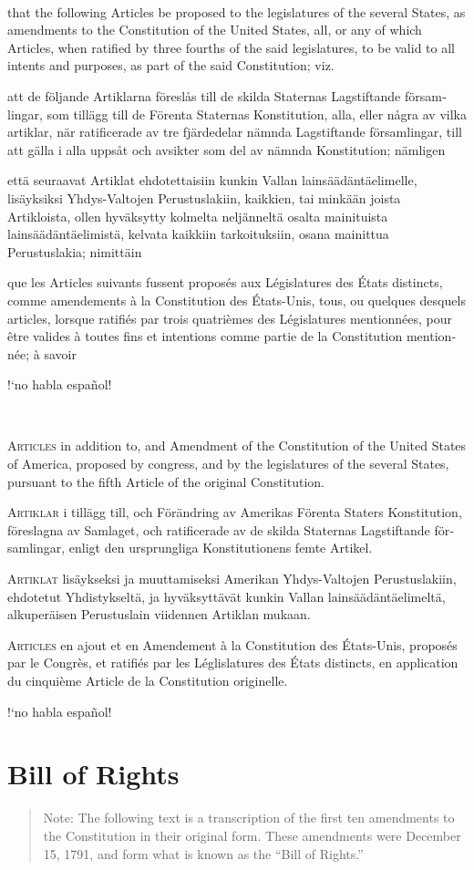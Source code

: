 \documentclass[a4paper,landscape,10pt]{article}
\newcommand{\tblock}[5]{\noindent\begin{minipage}[t]{0.18\textwidth}\foreignlanguage{english}{#1}\end{minipage}\hskip 0.025\textwidth\begin{minipage}[t]{0.18\textwidth}\foreignlanguage{swedish}{#2}\end{minipage}\hskip 0.025\textwidth\begin{minipage}[t]{0.18\textwidth}\foreignlanguage{finnish}{#3}\end{minipage}\hskip 0.025\textwidth\begin{minipage}[t]{0.18\textwidth}\foreignlanguage{french}{#4}\end{minipage}\hskip 0.025\textwidth\begin{minipage}[t]{0.18\textwidth}\foreignlanguage{spanish}{#5}\end{minipage}}
\begin{document}
~

\tblock
{that the following Articles be proposed to the \Glspl{legislature} of the several States, as amendments to the Constitution of the United States, all, or any of which Articles, when ratified by three fourths of the said \Glspl{legislature}, to be valid to all intents and purposes, as part of the said Constitution; viz.}
{att de följande Artiklarna föreslås till de skilda Staternas Lagstiftande församlingar, som tillägg till de Förenta Staternas Konstitution, alla, eller några av vilka artiklar, när ratificerade av tre fjärdedelar nämnda Lagstiftande församlingar, till att gälla i alla uppsåt och avsikter som del av nämnda Konstitution; nämligen}
{että seuraavat Artiklat ehdotettaisiin kunkin Vallan lainsäädäntäelimelle, lisäyksiksi Yhdys-Valtojen Perustuslakiin, kaikkien, tai minkään joista Artikloista, ollen hyväksytty kolmelta neljänneltä osalta mainituista lainsäädäntäelimistä, kelvata kaikkiin tarkoituksiin, osana mainittua Perustuslakia; nimittäin}
{que les Articles suivants fussent proposés aux Législatures des États distincts, comme amendements à la Constitution des États-Unis, tous, ou quelques desquels articles, lorsque ratifiés par trois quatrièmes des Législatures mentionnées, pour être valides à toutes fins et intentions comme partie de la Constitution mentionnée; à savoir}
{!`no habla español!}

~

\tblock
{\textsc{Articles} in addition to, and Amendment of the Constitution of the United States of America, proposed by \Gls{congress}, and \glsdisp{ratify}{ratified} by the \Glspl{legislature} of the several States, pursuant to the fifth Article of the original Constitution.}
{\textsc{Artiklar} i tillägg till, och Förändring av Amerikas Förenta Staters Konstitution, föreslagna av Samlaget, och ratificerade av de skilda Staternas Lagstiftande församlingar, enligt den ursprungliga Konstitutionens femte Artikel.}
{\textsc{Artiklat} lisäykseksi ja muuttamiseksi Amerikan Yhdys-Valtojen Perustuslakiin, ehdotetut Yhdistykseltä, ja hyväksyttävät kunkin Vallan lainsäädäntäelimeltä, alkuperäisen Perustuslain viidennen Artiklan mukaan.}
{\textsc{Articles} en ajout et en Amendement à la Constitution des États-Unis, proposés par le Congrès, et ratifiés par les Léglislatures des États distincts, en application du cinquième Article de la Constitution originelle.}
{!`no habla español!}

\section*{Bill of Rights}
\begin{quote}\small{}
Note: The following text is a transcription of the first ten amendments to the Constitution in their original form. These amendments were  December 15, 1791, and form what is known as the ``Bill of Rights.''
\end{quote}
\end{document}
